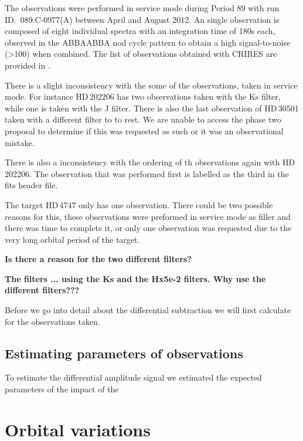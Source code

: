 The observations were performed in service mode during Period 89 with run {ID.~089.C-0977(A)} between April and August 2012. An single observation is composed of eight individual spectra with an integration time of 180\si{\second} each, observed in the {ABBAABBA} nod cycle pattern to obtain a high signal-to-noise (>100) when combined. The list of observations obtained with {CRIRES} are provided in .

There is a slight inconsistency with the some of the observations, taken in service mode. For instance {HD\,202206} has two observations taken with the {Ks} filter, while one is taken with the {J} filter. There is also the last observation of {HD\,30501} taken with a different filter to to rest. We are unable to access the phase two proposal to determine if this was requested as such or it was an observational mistake. 

There is also a inconsistency with the ordering of th observations again with {HD\,202206}. The observation that was performed first is labelled as the third in the fits header file.

The target {HD\,4747} only has one observation. There could be two possible reasons for this, these observations were preformed in service mode as filler and there was time to complete it, or only one observation was requested due to the very long orbital period of the target.

\textbf{Is there a reason for the two different filters?}





\textbf{The filters ... using the {Ks} and the {Hx5e-2} filters. Why use the different filters???}

Before we go into detail about the differential subtraction we will first calculate for the observations taken.


\subsection{Estimating parameters of observations}
To estimate the differential amplitude signal we estimated the expected parameters of the impact of the





\section{Orbital variations}

